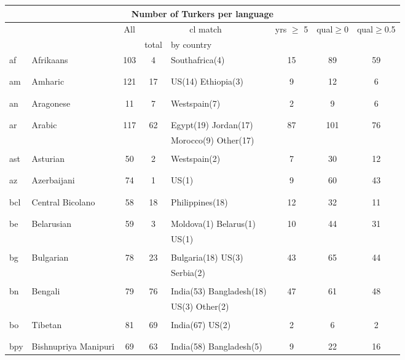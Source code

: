 \begin{figure}[h]
\centering
\begin{tabular}{llcclccc}
\multicolumn{8}{c}{Number of Turkers per language}\\
\hline\hline
&&All&\multicolumn{2}{c}{cl match}&yrs $\geq$ 5&qual$\geq$0&qual$\geq$0.5\\
&&&total&by country&&\\
\hline\hline
af&Afrikaans&103&4&Southafrica(4) &15&89&59\\
&&&&&&&\\
&&&&&&&\\
am&Amharic&121&17&US(14) Ethiopia(3) &9&12&6\\
&&&&&&&\\
&&&&&&&\\
an&Aragonese&11&7&Westspain(7) &2&9&6\\
&&&&&&&\\
&&&&&&&\\
ar&Arabic&117&62&Egypt(19) Jordan(17) &87&101&76\\
&&&&Morocco(9) Other(17) &&&\\
&&&&&&&\\
ast&Asturian&50&2&Westspain(2) &7&30&12\\
&&&&&&&\\
&&&&&&&\\
az&Azerbaijani&74&1&US(1) &9&60&43\\
&&&&&&&\\
&&&&&&&\\
bcl&Central Bicolano&58&18&Philippines(18) &12&32&11\\
&&&&&&&\\
&&&&&&&\\
be&Belarusian&59&3&Moldova(1) Belarus(1) &10&44&31\\
&&&&US(1) &&&\\
&&&&&&&\\
bg&Bulgarian&78&23&Bulgaria(18) US(3) &43&65&44\\
&&&&Serbia(2) &&&\\
&&&&&&&\\
bn&Bengali&79&76&India(53) Bangladesh(18) &47&61&48\\
&&&&US(3) Other(2) &&&\\
&&&&&&&\\
bo&Tibetan&81&69&India(67) US(2) &2&6&2\\
&&&&&&&\\
&&&&&&&\\
bpy&Bishnupriya Manipuri&69&63&India(58) Bangladesh(5) &9&22&16\\

\end{tabular}
\end{figure}
